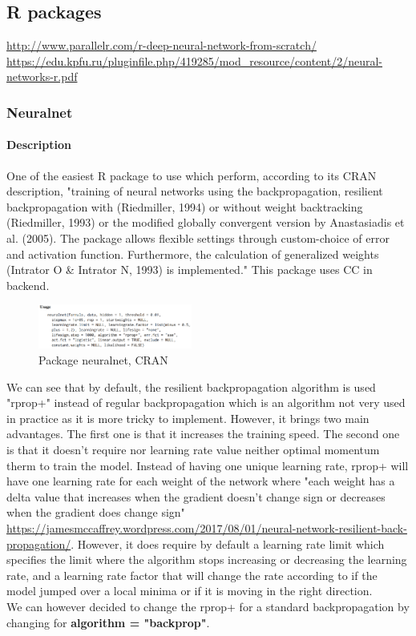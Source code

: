 \documentclass[6pt,letter]{article}\usepackage[]{graphicx}\usepackage[]{color}
\begin{document}
\subsection{R packages}
\url{http://www.parallelr.com/r-deep-neural-network-from-scratch/}
\url{https://edu.kpfu.ru/pluginfile.php/419285/mod_resource/content/2/neural-networks-r.pdf}
\subsubsection{Neuralnet}
\paragraph{Description}
One of the easiest R package to use which perform, according to its CRAN description, "training of neural networks using the backpropagation, resilient backpropagation with (Riedmiller, 1994) or without weight backtracking (Riedmiller, 1993) or the modified globally convergent version by Anastasiadis et al. (2005). The package allows flexible settings through custom-choice of error and activation function. Furthermore, the calculation of generalized weights (Intrator O \& Intrator N, 1993) is implemented." This package uses C\/C\+\+ in backend.

\begin{figure}[h]
    \centering
    \includegraphics[width=0.45\textwidth]{neuralnet_package.png}
     \caption{Package neuralnet, CRAN}
\end{figure}


We can see that by default, the resilient backpropagation algorithm is used "rprop+" instead of regular backpropagation which is an algorithm not very used in practice as it is more tricky to implement. However, it brings two main advantages. The first one is that it increases the training speed. The second one is that it doesn't require nor learning rate value neither optimal momentum therm to train the model. Instead of having one unique learning rate, rprop+ will have one learning rate for each weight of the network where "each weight has a delta value that increases when the gradient doesn't change sign or decreases when the gradient does change sign" \url{https://jamesmccaffrey.wordpress.com/2017/08/01/neural-network-resilient-back-propagation/}. However, it does require by default a learning rate limit which specifies the limit where the algorithm stops increasing or decreasing the learning rate, and a learning rate factor that will change the rate according to if the model jumped over a local minima or if it is moving in the right direction.\\
We can however decided to change the rprop+ for a standard backpropagation by changing for \textbf{algorithm = "backprop"}.\\
\end{document}
